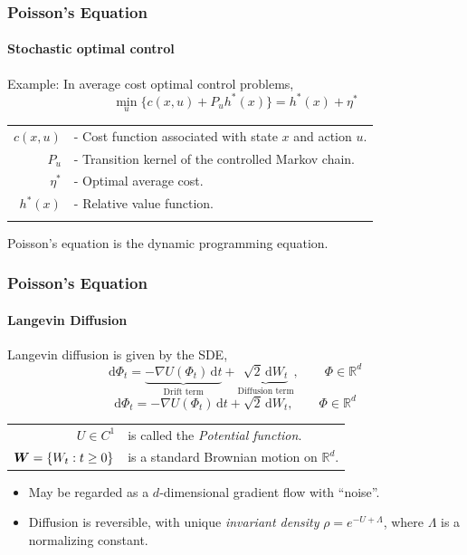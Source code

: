 \documentclass[xcolor=dvipsnames, subsection=false]{beamer}
\def\alertb#1{\alert{\color{BrickRed}  #1}}
\def\alertb#1{\alert{\color{BrickRed}  #1}}
\def\bfmath#1{{\mathchoice{\mbox{\boldmath$#1$}}%
{\mbox{\boldmath$#1$}}%
{\mbox{\boldmath$\scriptstyle#1$}}%
{\mbox{\boldmath$\scriptscriptstyle#1$}}}}
\def\bfmW{\bfmath{W}}
\newcommand{\field}[1]{\mathbb{#1}}
\def\Re{\field{R}}
\def\markovstate{\Phi}
\def\ud{\text{d}}
\newcommand{\pot}{U}
\newcommand{\pr}{\rho}
\begin{document}
\begin{frame}
\frametitle{Poisson's Equation}
\framesubtitle{Stochastic optimal control}
 \alertb{Example:} In average cost optimal control problems,
\[
\min_u \{c(x,u) + P_u h^*(x) \} = h^*(x) + \eta^*
\]
\begin{tabular}{rl}
$c(x,u)$ & - Cost function associated with state $x$ and action $u$.\\
$P_u$ & - Transition kernel of the controlled Markov chain. \\	
$\eta^*$ & - Optimal average cost.\\
$h^*(x)$ & - \alertb{Relative value function}. \\\pause
\end{tabular}
Poisson's equation is the dynamic programming equation.
\end{frame}

\begin{frame}
\frametitle{Poisson's Equation}
\framesubtitle{Langevin Diffusion}
\alertb{Langevin diffusion} is given by the SDE,
 {\[
\ud \markovstate_t =\underbrace{- \nabla \pot(\markovstate_t) \, \ud t}_{\text{Drift term}}
+ \underbrace{\sqrt{2} \, \ud W_t}_{\text{Diffusion term}}, \qquad \markovstate \in \Re^d
\label{e:langevin_intro}
\]}
 {\[
	\ud \markovstate_t =- \nabla \pot(\markovstate_t) \, \ud t
	+ \sqrt{2} \, \ud W_t, \qquad \markovstate \in \Re^d
	\]}
\begin{tabular}{rl}
$\pot \in C^1$ & is called the \textit{Potential function}.\\
$\bfmW =\{W_t : t\ge 0\}$ & is a standard Brownian motion on $\Re^d$. \pause \\[1em]
\end{tabular}
\begin{itemize}
\item May be regarded as a $d$-dimensional gradient flow with ``noise''. \pause
\item Diffusion is reversible, with unique \textit{invariant density} $\pr=e^{-\pot+\Lambda}$, where $\Lambda$ is a normalizing constant.
\end{itemize}
\end{frame}
\end{document}
